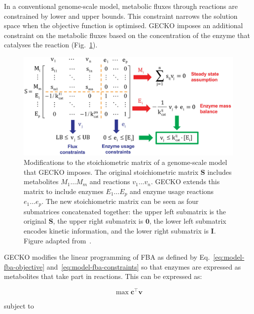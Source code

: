 In a conventional genome-scale model, metabolic fluxes through reactions are constrained by lower and upper bounds.
This constraint narrows the solution space when the objective function is optimised.
GECKO imposes an additional constraint on the metabolic fluxes based on the concentration of the enzyme that catalyses the reaction (Fig.\ \ref{fig:model-gecko}).

\begin{figure}[hb!]
  \centering
  \includegraphics[width=0.9\linewidth]{sanchezImprovingPhenotypePredictions2017_1b_adapted}
  \caption[
    Modifications to the stoichiometric matrix of a genome-scale model that GECKO imposes
  ]{
    Modifications to the stoichiometric matrix of a genome-scale model that GECKO imposes.
    The original stoichiometric matrix $\mathbf{S}$ includes metabolites $M_{1} \ldots M_{m}$ and reactions $v_{1} \ldots v_{n}$.
    GECKO extends this matrix to include enzymes $E_{1} \ldots E_{p}$ and enzyme usage reactions $e_{1} \ldots e_{p}$.
    The new stoichiometric matrix can be seen as four submatrices concatenated together: the upper left submatrix is the original $\mathbf{S}$, the upper right submatrix is $\mathbf{0}$, the lower left submatrix encodes kinetic information, and the lower right submatrix is $\mathbf{I}$.
    Figure adapted from~\textcite{sanchezImprovingPhenotypePredictions2017}.
  }
  \label{fig:model-gecko}
\end{figure}

GECKO modifies the linear programming of FBA as defined by Eq.\ \ref{eq:model-fba-objective} and~\ref{eq:model-fba-constraints} so that enzymes are expressed as metabolites that take part in reactions.
This can be expressed as:

\begin{equation}
  \max \mathbf{c}^{\intercal} \mathbf{v}
  \label{eq:model-gecko-fba-objective}
\end{equation}

subject to

